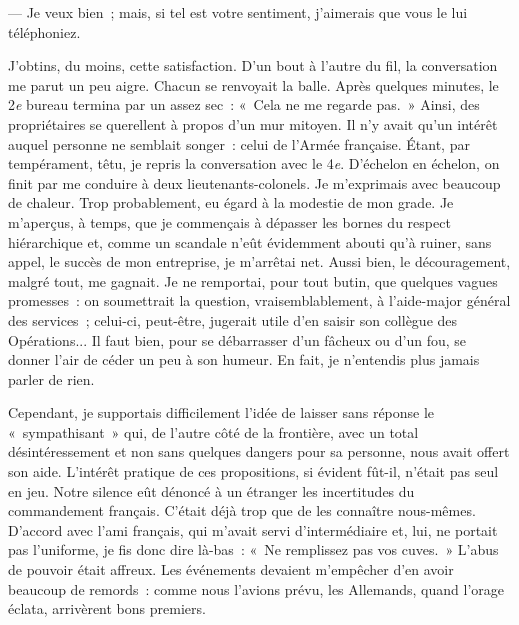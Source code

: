 \documentclass[french,twoside]{book} %
\begin{document}
— Je veux bien ; mais, si tel est votre sentiment, j’aimerais que vous le lui téléphoniez.\par
J’obtins, du moins, cette satisfaction. D’un bout à l’autre du fil, la conversation me parut un peu aigre. Chacun se renvoyait la balle. Après quelques minutes, le 2\emph{e} bureau termina par un assez sec : « Cela ne me regarde pas. » Ainsi, des propriétaires se querellent à propos d’un mur mitoyen. Il n’y avait qu’un intérêt auquel personne ne semblait songer : celui de l’Armée française. Étant, par tempérament, têtu, je repris la conversation avec le 4\emph{e}. D’échelon en échelon, on finit par me conduire à deux lieutenants-colonels. Je m’exprimais avec beaucoup de chaleur. Trop probablement, eu égard à la modestie de mon grade. Je m’aperçus, à temps, que je commençais à dépasser les bornes du respect hiérarchique et, comme un scandale n’eût évidemment abouti qu’à ruiner, sans appel, le succès de mon entreprise, je m’arrêtai net. Aussi bien, le découragement, malgré tout, me gagnait. Je ne remportai, pour tout butin, que quelques vagues promesses : on soumettrait la question, vraisemblablement, à l’aide-major général des services ; celui-ci, peut-être, jugerait utile d’en saisir son collègue des Opérations... Il faut bien, pour se débarrasser d’un fâcheux ou d’un fou, se donner l’air de céder un peu à son humeur. En fait, je n’entendis plus jamais parler de rien.\par
Cependant, je supportais difficilement l’idée de laisser sans réponse le « sympathisant » qui, de l’autre côté de la frontière, avec un total   désintéressement et non sans quelques dangers pour sa personne, nous avait offert son aide. L’intérêt pratique de ces propositions, si évident fût-il, n’était pas seul en jeu. Notre silence eût dénoncé à un étranger les incertitudes du commandement français. C’était déjà trop que de les connaître nous-mêmes. D’accord avec l’ami français, qui m’avait servi d’intermédiaire et, lui, ne portait pas l’uniforme, je fis donc dire là-bas : « Ne remplissez pas vos cuves. » L’abus de pouvoir était affreux. Les événements devaient m’empêcher d’en avoir beaucoup de remords : comme nous l’avions prévu, les Allemands, quand l’orage éclata, arrivèrent bons premiers.\par
\end{document}
